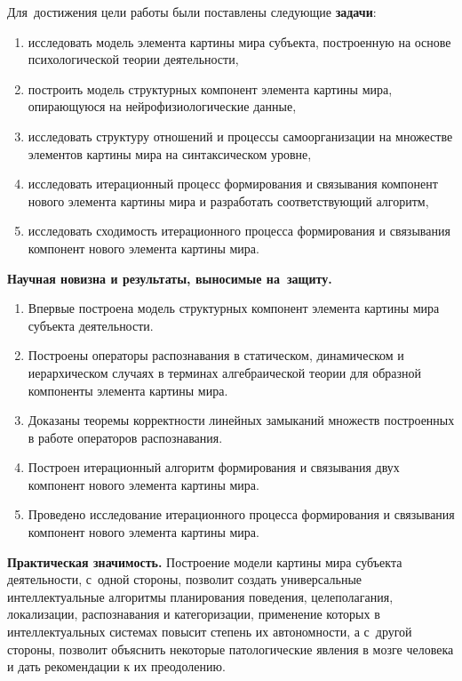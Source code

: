 Для~достижения цели работы были поставлены следующие \textbf{задачи}:
\begin{enumerate}
  \item исследовать модель элемента картины мира субъекта, построенную на основе психологической теории деятельности,
  \item построить модель структурных компонент элемента картины мира, опирающуюся на нейрофизиологические данные,
  \item исследовать структуру отношений и процессы самоорганизации на множестве элементов картины мира на синтаксическом уровне,
  \item исследовать итерационный процесс формирования и связывания компонент нового элемента картины мира и разработать соответствующий алгоритм,
  \item исследовать сходимость итерационного процесса формирования и связывания компонент нового элемента картины мира.
\end{enumerate}

\textbf{Научная новизна и результаты, выносимые на~защиту.}
\begin{enumerate}
	\renewcommand\labelenumi{\theenumi.}
  \item Впервые построена модель структурных компонент элемента картины мира субъекта деятельности.
  \item Построены операторы распознавания в статическом, динамическом и иерархическом случаях в терминах алгебраической теории для образной компоненты элемента картины мира.
  \item Доказаны теоремы корректности линейных замыканий множеств построенных в работе операторов распознавания.
  \item Построен итерационный алгоритм формирования и связывания двух компонент нового элемента картины мира.
  \item Проведено исследование итерационного процесса формирования и связывания компонент нового элемента картины мира.
\end{enumerate}

\textbf{Практическая значимость.} Построение модели картины мира субъекта деятельности, с~одной стороны, позволит создать универсальные интеллектуальные алгоритмы планирования поведения, целеполагания, локализации, распознавания и категоризации, применение которых в интеллектуальных системах повысит степень их автономности, а с~другой стороны, позволит объяснить некоторые патологические явления в мозге человека и дать рекомендации к их преодолению.


